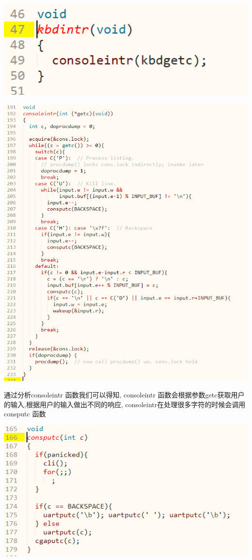 \includegraphics[width=6in]{figures/input/image9.png}

\includegraphics[width=6in]{figures/input/image10.png}


通过分析consoleintr 函数我们可以得知, consoleintr 函数会根据参数getc获取用户的输入,根据用户的输入做出不同的响应, consoleintr在处理很多字符的时候会调用 consputc 函数

\includegraphics[width=6in]{figures/input/image11.png}

